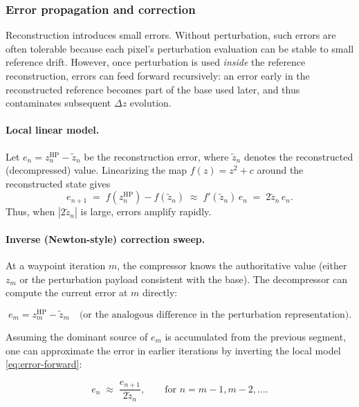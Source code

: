 \subsubsection{Error propagation and correction}

Reconstruction introduces small errors.  Without perturbation, such errors are
often tolerable because each pixel's perturbation evaluation can be stable to
small reference drift.  However, once perturbation is used \emph{inside} the
reference reconstruction, errors can feed forward recursively: an error early in
the reconstructed reference becomes part of the base used later, and thus
contaminates subsequent \(\Delta z\) evolution.

\paragraph{Local linear model.}
Let \(e_n = z_n^{\mathrm{HP}} - \tilde z_n\) be the reconstruction error, where
\(\tilde z_n\) denotes the reconstructed (decompressed) value.  Linearizing the
map \(f(z)=z^2+c\) around the reconstructed state gives
\begin{equation}
  e_{n+1}
  \;=\; f(z_n^{\mathrm{HP}}) - f(\tilde z_n)
  \;\approx\; f'(\tilde z_n)\, e_n
  \;=\; 2\tilde z_n\, e_n.
  \label{eq:error-forward}
\end{equation}
Thus, when \(|2\tilde z_n|\) is large, errors amplify rapidly.

\paragraph{Inverse (Newton-style) correction sweep.}
At a waypoint iteration \(m\), the compressor knows the authoritative value
(either \(z_m\) or the perturbation payload consistent with the base).  The
decompressor can compute the current error at \(m\) directly:

\begin{equation}
  e_m = z_m^{\mathrm{HP}} - \tilde z_m
  \quad\text{(or the analogous difference in the perturbation representation).}
\end{equation}

Assuming the dominant source of \(e_m\) is accumulated from the previous segment,
one can approximate the error in earlier iterations by inverting the local model
\eqref{eq:error-forward}:

\begin{equation}
  e_n \;\approx\; \frac{e_{n+1}}{2\tilde z_n},
  \qquad \text{for } n=m-1,m-2,\dots.
  \label{eq:error-backward}
\end{equation}

